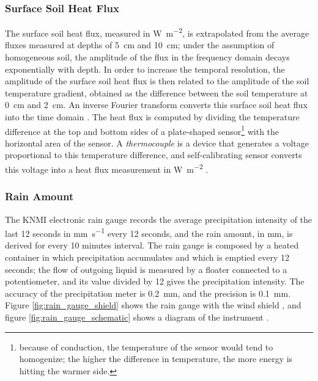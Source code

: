 \documentclass[a4paper,11pt]{kth-mag}
\begin{document}

\subsubsection{Surface Soil Heat Flux}
The surface soil heat flux, measured in \si{\watt\per\square\meter}, is extrapolated from the average fluxes measured at depths of \SI{5}{\centi\meter} and \SI{10}{\centi\meter}; under the assumption of homogeneous soil, the amplitude of the flux in the frequency domain decays exponentially with depth. In order to increase the temporal resolution, the amplitude of the surface soil heat flux is then related to the amplitude of the soil temperature gradient, obtained as the difference between the soil temperature at \SI{0}{\centi\meter} and \SI{2}{\centi\meter}. An inverse Fourier transform converts this surface soil heat flux into the time domain \citep[Appendix~A]{surface_soilheat}. The heat flux is computed by dividing the temperature difference at the top and bottom sides of a plate-shaped sensor\footnote{because of conduction, the temperature of the sensor would tend to homogenize; the higher the difference in temperature, the more energy is hitting the warmer side.} with the horizontal area of the sensor. A \emph{thermocouple} is a device that generates a voltage proportional to this temperature difference, and self-calibrating sensor converts this voltage into a heat flux measurement in \si{\watt\per\square\meter}  \citep{soilheat_sensor}.


\subsubsection{Rain Amount}
The KNMI electronic rain gauge \citep{rain,windsheld_rain} records the average precipitation intensity of the last 12 seconds in \si{\milli\meter\per\second} every 12 seconds, and the rain amount, in \si{\milli\meter}, is derived for every 10 minutes interval. The rain gauge is composed by a heated container in which precipitation accumulates and which is emptied every 12 seconds; the flow of outgoing liquid is measured by a floater connected to a potentiometer, and its value divided by 12 gives the precipitation intensity. The accuracy of the precipitation meter is \SI{0.2}{\milli\meter}, and the precision is \SI{0.1}{\milli\meter}. Figure \ref{fig:rain_gauge_shield} shows the rain gauge with the wind shield \citep{windsheld_rain}, and figure \ref{fig:rain_gauge_schematic} shows a diagram of the instrument \citep{rain}.
\end{document}

